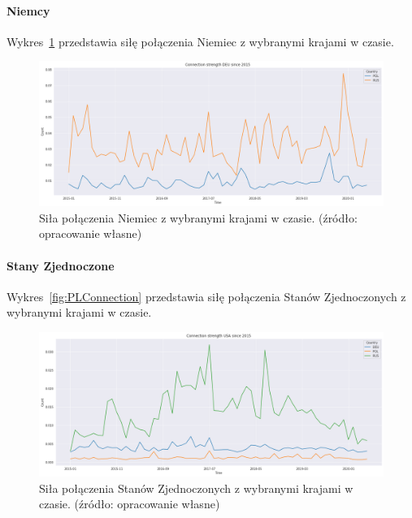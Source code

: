 \documentclass[11pt]{report}
\begin{document}
    \paragraph{Niemcy}

    Wykres~\ref{fig:DEUConnection} przedstawia siłę połączenia Niemiec z wybranymi krajami w czasie.

    \begin{figure}[!htp]
        \centering
        \includegraphics[width=\linewidth]{fig/DEU/DEUConnection.png}
        \caption{Siła połączenia Niemiec z wybranymi krajami w czasie. (źródło: opracowanie własne)}
        \label{fig:DEUConnection}
    \end{figure}

    \paragraph{Stany Zjednoczone}

    Wykres~\ref{fig:PLConnection} przedstawia siłę połączenia Stanów Zjednoczonych z wybranymi krajami w czasie.

    \begin{figure}[!htp]
        \centering
        \includegraphics[width=\linewidth]{fig/USA/USAConnection.png}
        \caption{Siła połączenia Stanów Zjednoczonych z wybranymi krajami w czasie. (źródło: opracowanie własne)}
        \label{fig:USAConnection}
    \end{figure}
\end{document}
